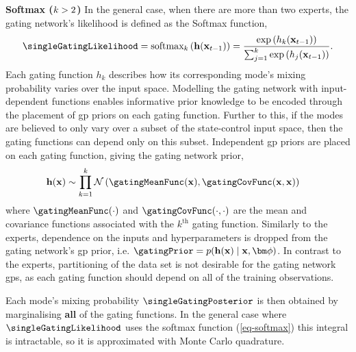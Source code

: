\documentclass{mimosis-class/mimosis}
\numberwithin{equation}{chapter}
\newcommand{\numData}{\ensuremath{t}}
\newcommand{\modeInd}{\ensuremath{k}}
\newcommand{\ModeInd}{\ensuremath{\MakeUppercase{\modeInd}}}
\newcommand{\allData}[1]{\ensuremath{\MakeUppercase{#1}}}
\newcommand{\mode}[1]{\ensuremath{#1_{\modeInd}}}
\newcommand{\x}{\ensuremath{\mathbf{x}}}
\newcommand{\singleInput}{\ensuremath{\x_{\numData-1}}}
\newcommand{\allInput}{\ensuremath{\allData{\x}}}
\newcommand{\gatingFunc}{\ensuremath{h}}
\newcommand{\GatingFunc}{\ensuremath{\mathbf{\gatingFunc}}}
\newcommand{\gatingParams}{\ensuremath{\bm\phi}}
\begin{document}
{\textbf{Softmax (\(\ModeInd>2\))} In the general case, when there are more than two experts,
the gating network's likelihood is defined as the Softmax function,
\begin{align} \label{eq-softmax}
\singleGatingLikelihood = \text{softmax}_{\modeInd}\left(\GatingFunc(\singleInput)\right) = \frac{\text{exp}\left(\mode{\gatingFunc}(\singleInput)\right)}{\sum_{j=1}^{\ModeInd} \text{exp}\left(\gatingFunc_j(\singleInput) \right)}.
\end{align}
Each gating function \(\mode{\gatingFunc}\) describes how its corresponding mode's mixing
probability varies over the input space.
Modelling the gating network with input-dependent functions enables
informative prior knowledge to be encoded through the placement of \acrshort{gp} priors on each gating function.
Further to this, if the modes are believed to only vary over a subset of the state-control input space,
then the gating functions can depend only on this subset.
Independent \acrshort{gp} priors are placed on each gating function, giving the gating network prior,
\begin{align} \label{eq-gating-prior}
\GatingFunc(\allInput) &\sim \prod_{\modeInd=1}^\ModeInd \mathcal{N}\left( \gatingMeanFunc(\allInput), \gatingCovFunc(\allInput, \allInput) \right)
\end{align}
where \(\gatingMeanFunc(\cdot)\) and \(\gatingCovFunc(\cdot,\cdot)\) are the mean and covariance functions
associated with the \(\modeInd^\text{th}\) gating function.
Similarly to the experts, dependence on the inputs and hyperparameters is dropped from the gating network's \acrshort{gp} prior,
i.e. \(\gatingPrior = p(\GatingFunc(\allInput) \mid \allInput, \gatingParams)\).
In contrast to the experts, partitioning of the data set is not desirable for the gating network \acrshort{gps},
as each gating function should depend on all of the training observations.

Each mode's mixing probability \(\singleGatingPosterior\) is then obtained by marginalising
\textbf{all} of the gating functions.
In the general case where \(\singleGatingLikelihood\) uses the softmax function
(\cref{eq-softmax}) this integral is intractable, so it is approximated with Monte Carlo quadrature.

}
\end{document}
